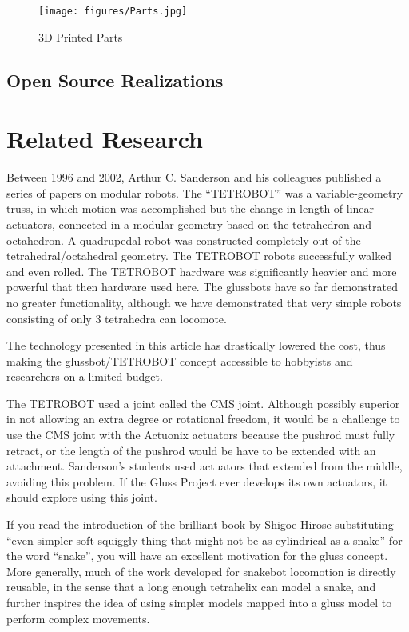 \documentclass[11pt]{article}
\begin{document}
\begin{figure}[H]
  \centering
    \texttt{[image: figures/Parts.jpg]}
    \caption[3D Printed Parts]{3D Printed Parts}
\end{figure}



\subsection{Open Source Realizations}

\section{Related Research}

Between 1996 and 2002, Arthur C. Sanderson and his colleagues published a series of
papers\cite{sanderson1996modular,lee2002dynamic,lee1999dynamics} on modular robots.
The ``TETROBOT'' was a variable-geometry truss, in which motion was accomplished but the change
in length of linear actuators, connected in a modular geometry based on the tetrahedron and octahedron.
A quadrupedal robot was constructed completely out of the tetrahedral/octahedral geometry.
The TETROBOT robots successfully walked and even rolled. The TETROBOT hardware was significantly
heavier and more powerful that then hardware used here. The glussbots have so far demonstrated no greater functionality,
although we have demonstrated that very simple robots consisting of only 3 tetrahedra can locomote.

The technology presented in this article has drastically lowered the cost,
thus making the glussbot/TETROBOT concept
accessible to hobbyists and researchers on a limited budget.

The TETROBOT used a joint called the CMS joint. Although
possibly superior in not allowing an extra degree or rotational freedom, it would be a challenge to use the CMS
joint with the Actuonix actuators because the pushrod must fully retract, or the length of the pushrod would be
have to be extended with an attachment. Sanderson's students used actuators that
extended from the middle, avoiding this problem. If the Gluss Project ever develops its own actuators, it should
explore using this joint.

If you read the introduction of the brilliant book by Shigoe Hirose\cite{hirose1993biologically} substituting
``even simpler soft squiggly thing that might not be as cylindrical as a snake'' for the word ``snake'', you will have
an excellent motivation for the gluss concept.  More generally, much of the work developed for snakebot
locomotion %
is directly reusable, in the sense that a long enough tetrahelix can
model a snake, and further inspires the idea of using simpler models mapped into a gluss model to perform
complex movements.
\end{document}
